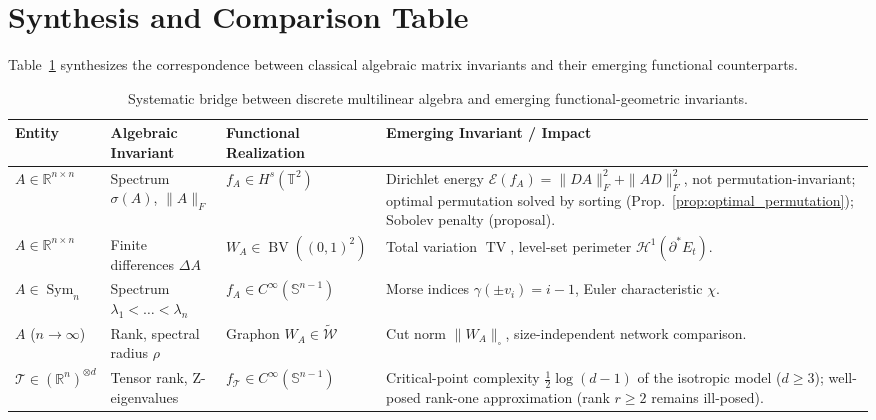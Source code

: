 \documentclass[11pt,a4paper,reqno]{amsart}
\theoremstyle{definition}
\numberwithin{equation}{section}
\newcommand{\R}{\mathbb{R}}
\newcommand{\Sph}{\mathbb{S}}
\newcommand{\Tor}{\mathbb{T}}
\newcommand{\BV}{\operatorname{BV}}
\newcommand{\TV}{\operatorname{TV}}
\newcommand{\cutnorm}[1]{\|#1\|_{\square}}
\begin{document}
\section{Synthesis and Comparison Table}
\label{sec:synthesis}

Table~\ref{tab:comparison} synthesizes the correspondence between classical algebraic matrix invariants and their emerging functional counterparts.

\begin{table}[htbp]
\centering
\footnotesize
\renewcommand{\arraystretch}{1.3}
\begin{tabularx}{\textwidth}{@{}l >{\raggedright\arraybackslash}X >{\raggedright\arraybackslash}X >{\raggedright\arraybackslash}X@{}}
\toprule
\textbf{Entity} & \textbf{Algebraic Invariant} & \textbf{Functional Realization} & \textbf{Emerging Invariant / Impact} \\
\midrule
$A \in \R^{n \times n}$ & Spectrum $\sigma(A)$, $\|A\|_F$ & $f_A \in H^s(\Tor^2)$ & Dirichlet energy $\mathcal{E}(f_A) = \|DA\|_F^2 + \|AD\|_F^2$, not permutation-invariant; optimal permutation solved by sorting (Prop.~\ref{prop:optimal_permutation}); Sobolev penalty (proposal). \\
$A \in \R^{n \times n}$ & Finite differences $\Delta A$ & $W_A \in \BV((0,1)^2)$ & Total variation $\TV$, level-set perimeter $\mathcal{H}^1(\partial^* E_t)$. \\
$A \in \operatorname{Sym}_n$ & Spectrum $\lambda_1 < \dots < \lambda_n$ & $f_A \in C^\infty(\Sph^{n-1})$ & Morse indices $\gamma(\pm v_i) = i-1$, Euler characteristic $\chi$. \\
$A$ ($n \to \infty$) & Rank, spectral radius $\rho$ & Graphon $W_A \in \widetilde{\mathcal{W}}$ & Cut norm $\cutnorm{W_A}$, size-independent network comparison. \\
$\mathcal{T} \in (\R^n)^{\otimes d}$ & Tensor rank, Z-eigenvalues & $f_{\mathcal{T}} \in C^\infty(\Sph^{n-1})$ & Critical-point complexity $\frac12\log(d-1)$ of the isotropic model ($d \ge 3$); well-posed rank-one approximation (rank $r \ge 2$ remains ill-posed). \\
\bottomrule
\end{tabularx}
\caption{Systematic bridge between discrete multilinear algebra and emerging functional-geometric invariants.}
\label{tab:comparison}
\end{table}
\end{document}
